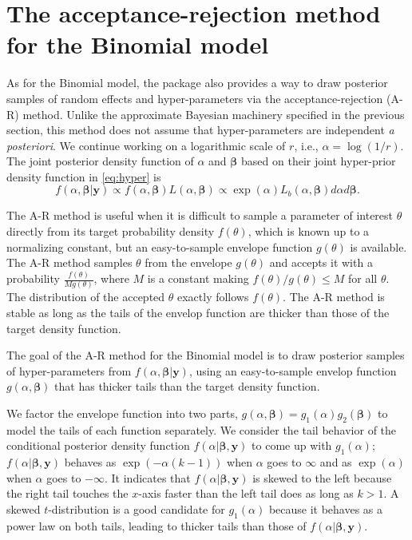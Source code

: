\documentclass[article]{jss}
\begin{document}
\section[Estimation]{The acceptance-rejection method for the Binomial model}\label{sec_accept}
As for the Binomial model, the package  also provides a way to draw  posterior samples of random effects and hyper-parameters via the acceptance-rejection (A-R) method. Unlike the approximate Bayesian machinery specified in the previous section, this method does not assume that hyper-parameters are independent \emph{a posteriori}. We continue working on a logarithmic scale of $r$, i.e., $\alpha=\log(1/r)$. The joint posterior density function of $\alpha$ and $\boldsymbol{\beta}$ based on their joint hyper-prior density function in  \eqref{eq:hyper} is 
\begin{equation}
f(\alpha, \boldsymbol{\beta} \vert \boldsymbol{y})\propto f(\alpha, \boldsymbol{\beta})L(\alpha, \boldsymbol{\beta})\propto \exp(\alpha)L_b(\alpha, \boldsymbol{\beta})d\alpha d\boldsymbol{\beta}.
\end{equation}

The A-R method \citep{everson2000inference, tang2002fitting, robert2013monte} is useful when it is difficult to sample a parameter of interest $\theta$ directly from its target probability density $f(\theta)$, which is known up to a normalizing constant, but an easy-to-sample envelope function $g(\theta)$ is available. The A-R method samples $\theta$  from the envelope $g(\theta)$ and accepts it with a probability $\frac{f(\theta)}{Mg(\theta)}$, where $M$ is a constant making $f(\theta)/g(\theta)\le M$ for all $\theta$. The distribution of the accepted $\theta$ exactly follows $f(\theta)$. The A-R method is stable as long as the tails of the envelop function are thicker than those of the target density function. 

The goal of the A-R method  for the  Binomial model is to  draw  posterior samples of hyper-parameters from $f(\alpha, \boldsymbol{\beta}\vert \boldsymbol{y})$, using an easy-to-sample envelop function $g(\alpha, \boldsymbol{\beta})$ that has thicker tails than the target density function. 

We factor the envelope function into two parts, $g(\alpha, \boldsymbol{\beta})=g_1(\alpha)g_2(\boldsymbol{\beta})$ to model the tails of each function separately. We consider the tail behavior of the conditional posterior density function $f(\alpha \vert \boldsymbol{\beta},  \boldsymbol{y})$ to come up with $g_1(\alpha)$; $f(\alpha \vert \boldsymbol{\beta},  \boldsymbol{y})$ behaves as $\exp(-\alpha(k-1))$ when $\alpha$ goes to $\infty$ and as $\exp(\alpha)$ when $\alpha$ goes to $-\infty$. It indicates that $f(\alpha \vert \boldsymbol{\beta},  \boldsymbol{y})$ is skewed to the left because the right tail touches the $x$-axis faster than the left tail does as long as $k>1$.  A skewed $t$-distribution  is a good candidate for $g_1(\alpha)$ because it behaves as a power law on both tails, leading to thicker tails than those of $f(\alpha \vert \boldsymbol{\beta},  \boldsymbol{y})$. 
\end{document}
